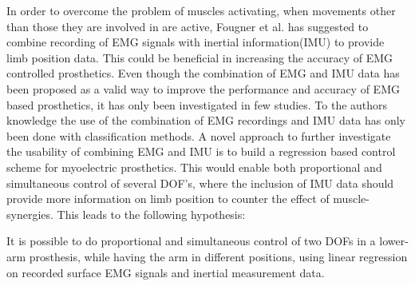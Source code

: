 In order to overcome the problem of muscles activating, when movements other than those they are involved in are active, Fougner et al. \cite{Fougner2011} has suggested to combine recording of EMG signals with inertial information(IMU) to provide limb position data. This could be beneficial in increasing the accuracy of EMG controlled prosthetics. 
Even though the combination of EMG and IMU data has been proposed as a valid way to improve the performance and accuracy of EMG based prosthetics, it has only been investigated in few studies. \cite{Roy2010, Imtiaz2014, jiang2012}
To the authors knowledge the use of the combination of EMG recordings and IMU data has only been done with classification methods. A novel approach to further investigate the usability of combining EMG and IMU is to build a regression based control scheme for myoelectric prosthetics. This would enable both proportional and simultaneous control of several DOF's, where the inclusion of IMU data should provide more information on limb position to counter the effect of muscle-synergies. 
This leads to the following hypothesis:
\begin{center}
	 It is possible to do proportional and simultaneous control of two DOFs in a lower-arm prosthesis, while having the arm in different positions, using linear regression on recorded surface EMG signals and inertial measurement data.
\end{center}








